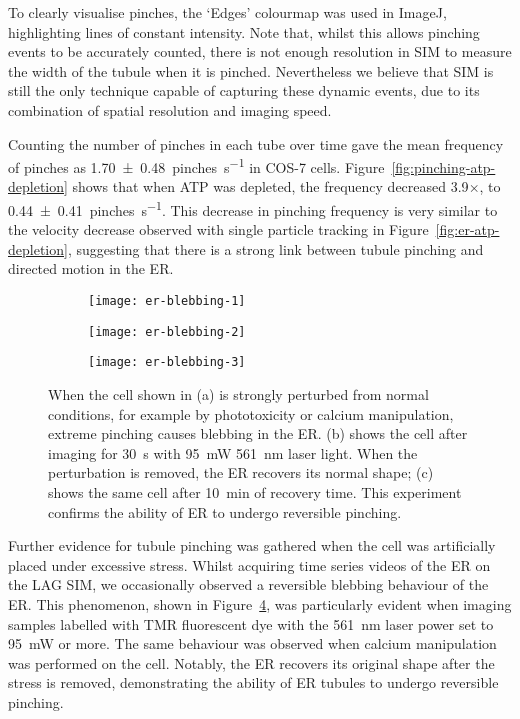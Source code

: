 To clearly visualise pinches, the `Edges' colourmap was used in ImageJ, highlighting lines of constant intensity. 
Note that, whilst this allows pinching events to be accurately counted, there is not enough resolution in SIM to measure the width of the tubule when it is pinched. 
Nevertheless we believe that SIM is still the only technique capable of capturing these dynamic events, due to its combination of spatial resolution and imaging speed. 

Counting the number of pinches in each tube over time gave the mean frequency of pinches as \SI[separate-uncertainty=true]{1.70 \pm 0.48}{pinches\per\second} in COS-7 cells. 
Figure~\ref{fig:pinching-atp-depletion} shows that when ATP was depleted, the frequency decreased 3.9$\times$, to \SI[separate-uncertainty=true]{0.44 \pm 0.41}{pinches\per\second}. 
This decrease in pinching frequency is very similar to the velocity decrease observed with single particle tracking in Figure~\ref{fig:er-atp-depletion}, suggesting that there is a strong link between tubule pinching and directed motion in the ER. 

\begin{figure}[htbp!]
\centering
\begin{subfigure}[b]{0.325\textwidth}
	\texttt{[image: er-blebbing-1]}
	\caption{}\label{fig:er-blebbing-1}
\end{subfigure}\hfill
\begin{subfigure}[b]{0.325\textwidth}
	\texttt{[image: er-blebbing-2]}
	\caption{}\label{fig:er-blebbing-2}
\end{subfigure}\hfill
\begin{subfigure}[b]{0.325\textwidth}
	\texttt{[image: er-blebbing-3]}
	\caption{}\label{fig:er-blebbing-3}
\end{subfigure}
\caption[ER: Phototoxicity confirms the ability of ER to undergo reversible pinching]{When the cell shown in (a) is strongly perturbed from normal conditions, for example by phototoxicity or calcium manipulation, extreme pinching causes blebbing in the ER. (b) shows the cell after imaging for \SI{30}{\second} with \SI{95}{\milli\watt} \SI{561}{\nano\metre} laser light. When the perturbation is removed, the ER recovers its normal shape; (c) shows the same cell after \SI{10}{\minute} of recovery time. This experiment confirms the ability of ER to undergo reversible pinching. } 
\label{fig:ER-blebbing}
\end{figure}

Further evidence for tubule pinching was gathered when the cell was artificially placed under excessive stress. 
Whilst acquiring time series videos of the ER on the LAG SIM, we occasionally observed a reversible blebbing behaviour of the ER. 
This phenomenon, shown in Figure~\ref{fig:ER-blebbing}, was particularly evident when imaging samples labelled with TMR fluorescent dye with the \SI{561}{\nano\meter} laser power set to \SI{95}{\milli\watt} or more. %
The same behaviour was observed when calcium manipulation~\cite{subramanian1997calcium} was performed on the cell. 
Notably, the ER recovers its original shape after the stress is removed, demonstrating the ability of ER tubules to undergo reversible pinching.

